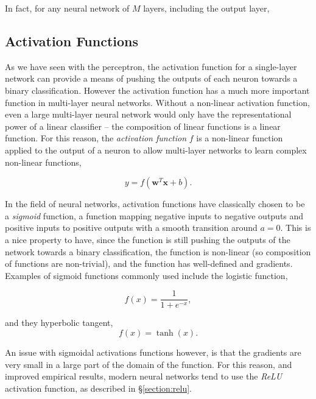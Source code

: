 \documentclass[thesis]{subfiles}
\begin{document}
In fact, for any neural network of $M$ layers, including the output layer,

\subsection{Activation Functions}
As we have seen with the perceptron, the activation function for a single-layer network can provide a means of pushing the outputs of each neuron towards a binary classification. However the activation function has a much more important function in multi-layer neural networks. Without a non-linear activation function, even a large multi-layer neural network would only have the representational power of a linear classifier -- the composition of linear functions is a linear function. For this reason, the \emph{activation function} $f$ is a non-linear function applied to the output of a neuron to allow multi-layer networks to learn complex non-linear functions,

\begin{equation}
y = f\left(\mathbf{w}^T\mathbf{x} + b\right).
\end{equation}

In the field of neural networks, activation functions have classically chosen to be a \emph{sigmoid} function, \ie a function mapping negative inputs to negative outputs and positive inputs to positive outputs with a smooth transition around $a = 0$. This is a nice property to have, since the function is still pushing the outputs of the network towards a binary classification, the function is non-linear (so composition of functions are non-trivial), and the function has well-defined and gradients. Examples of sigmoid functions commonly used include the logistic function, 

\begin{equation}
	f(x) = \frac{1}{1+e^{-x}},
\end{equation}

and they hyperbolic tangent,
\begin{equation}
	f(x) = \tanh(x).
\end{equation}

An issue with sigmoidal activations functions however, is that the gradients are very small in a large part of the domain of the function. For this reason, and improved empirical results, modern neural networks tend to use the \emph{ReLU} activation function, as described in \S\ref{section:relu}.
\end{document}
